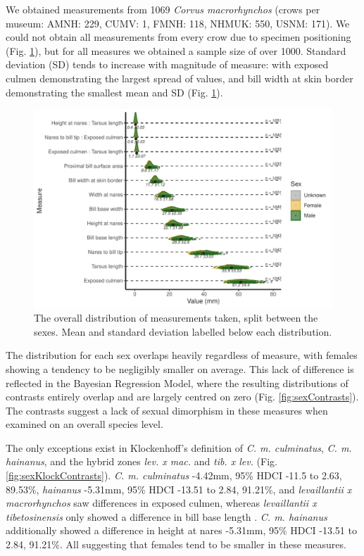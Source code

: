 \documentclass[10pt,a4paper]{article}
\begin{document}
We obtained measurements from 1069 \emph{Corvus macrorhynchos} (crows per museum: AMNH: 229, CUMV: 1, FMNH: 118, NHMUK: 550, USNM: 171).
We could not obtain all measurements from every crow due to specimen positioning (Fig. \ref{fig:overallPlot}), but for all measures we obtained a sample size of over 1000.
Standard deviation (SD) tends to increase with magnitude of measure: with exposed culmen demonstrating the largest spread of values, and bill width at skin border demonstrating the smallest mean and SD (Fig. \ref{fig:overallPlot}).

\begin{figure}
\includegraphics[width=0.9\linewidth]{../Figures/OverallSummaryPlot} \caption{The overall distribution of measurements taken, split between the sexes. Mean and standard deviation labelled below each distribution.}\label{fig:overallPlot}
\end{figure}

The distribution for each sex overlaps heavily regardless of measure, with females showing a tendency to be negligibly smaller on average.
This lack of difference is reflected in the Bayesian Regression Model, where the resulting distributions of contrasts entirely overlap and are largely centred on zero (Fig. \ref{fig:sexContrasts}).
The contrasts suggest a lack of sexual dimorphism in these measures when examined on an overall species level.

The only exceptions exist in Klockenhoff's definition of \emph{C. m. culminatus}, \emph{C. m. hainanus}, and the hybrid zones \emph{lev. x mac.} and \emph{tib. x lev.} (Fig. \ref{fig:sexKlockContrasts}).
\emph{C. m. culminatus} -4.42mm, 95\% HDCI -11.5 to 2.63, 89.53\%, \emph{hainanus} -5.31mm, 95\% HDCI -13.51 to 2.84, 91.21\%, and \emph{levaillantii x macrorhynchos} saw differences in exposed culmen, whereas \emph{levaillantii x tibetosinensis} only showed a difference in bill base length .
\emph{C. m. hainanus} additionally showed a difference in height at nares -5.31mm, 95\% HDCI -13.51 to 2.84, 91.21\%.
All suggesting that females tend to be smaller in these measures.
\end{document}
